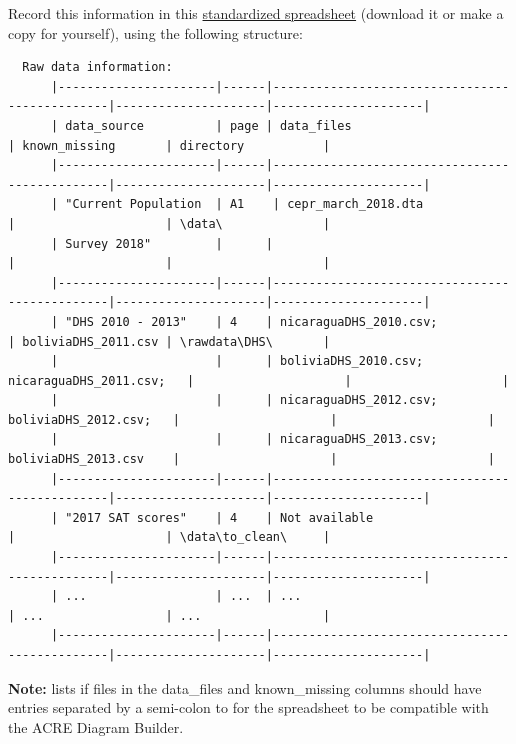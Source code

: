 \documentclass[]{book}
\begin{document}
Record this information in this \href{https://docs.google.com/spreadsheets/d/1LUIdVFH0OfR70C7z07TYeE-uWzKI_JIeWUMaYhqEKK0/edit\#gid=0\&range=A1}{standardized spreadsheet} (download it or make a copy for yourself), using the following structure:

\begin{verbatim}
  Raw data information:
      |----------------------|------|-----------------------------------------------|---------------------|---------------------|
      | data_source          | page | data_files                                    | known_missing       | directory           |
      |----------------------|------|-----------------------------------------------|---------------------|---------------------|
      | "Current Population  | A1    | cepr_march_2018.dta                          |                     | \data\              |
      | Survey 2018"         |      |                                               |                     |                     |
      |----------------------|------|-----------------------------------------------|---------------------|---------------------|
      | "DHS 2010 - 2013"    | 4    | nicaraguaDHS_2010.csv;                        | boliviaDHS_2011.csv | \rawdata\DHS\       |
      |                      |      | boliviaDHS_2010.csv; nicaraguaDHS_2011.csv;   |                     |                     |
      |                      |      | nicaraguaDHS_2012.csv; boliviaDHS_2012.csv;   |                     |                     |
      |                      |      | nicaraguaDHS_2013.csv; boliviaDHS_2013.csv    |                     |                     |
      |----------------------|------|-----------------------------------------------|---------------------|---------------------|
      | "2017 SAT scores"    | 4    | Not available                                 |                     | \data\to_clean\     |
      |----------------------|------|-----------------------------------------------|---------------------|---------------------|
      | ...                  | ...  | ...                                           | ...                 | ...                 |
      |----------------------|------|-----------------------------------------------|---------------------|---------------------|
\end{verbatim}

\textbf{Note:} lists if files in the data\_files and known\_missing columns should have entries separated by a semi-colon to for the spreadsheet to be compatible with the ACRE Diagram Builder.
\end{document}
